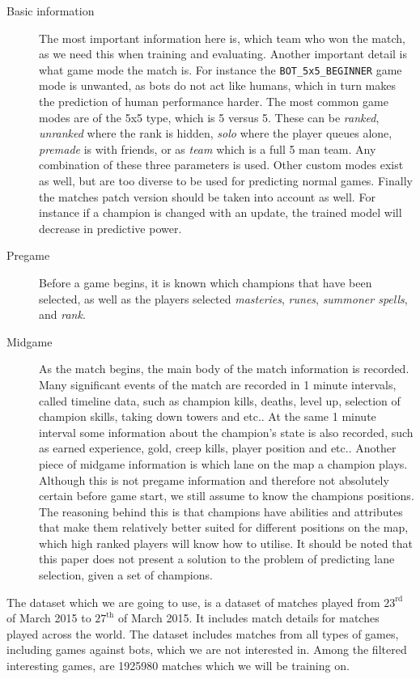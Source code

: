 \begin{description}
\item[Basic information] 
The most important information here is, which team who won the match, as we need this when training and evaluating. Another important detail is what game mode the match is. For instance the \texttt{BOT\_5x5\_BEGINNER} game mode is unwanted, as bots do not act like humans, which in turn makes the prediction of human performance harder. The most common game modes are of the 5x5 type, which is 5 versus 5. These can be \emph{ranked}, \emph{unranked} where the rank is hidden, \emph{solo} where the player queues alone, \emph{premade} is with friends, or as \emph{team} which is a full 5 man team. 
Any combination of these three parameters is used. %
Other custom modes exist as well, but are too diverse to be used for predicting normal games. Finally the matches patch version should be taken into account as well. For instance if a champion is changed with an update, the trained model will decrease in predictive power.
\item[Pregame]
Before a game begins, it is known which champions that have been selected, as well as the players selected \textit{masteries}, \emph{runes}, \emph{summoner spells}, and \emph{rank}. %
\item[Midgame]
As the match begins, the main body of the match information is recorded. Many significant events of the match are recorded in 1 minute intervals, called timeline data, such as champion kills, deaths, level up, selection of champion skills, taking down towers and etc.. At the same 1 minute interval some information about the champion's state is also recorded, such as earned experience, gold, creep kills, player position and etc.. Another piece of midgame information is which lane on the map a champion plays. Although this is not pregame information and therefore not absolutely certain before game start, we still assume to know the champions positions. The reasoning behind this is that champions have abilities and attributes that make them relatively better suited for different positions on the map, which high ranked players will know how to utilise. It should be noted that this paper does not present a solution to the problem of predicting lane selection, given a set of champions.
\end{description}

The dataset which we are going to use, is a dataset of matches played from $23^{\text{rd}}$ of March 2015 to $27^{\text{th}}$ of March 2015. It includes match details for matches played across the world. The dataset includes matches from all types of games, including games against bots, which we are not interested in. Among the filtered interesting games, are 1925980 matches which we will be training on.

